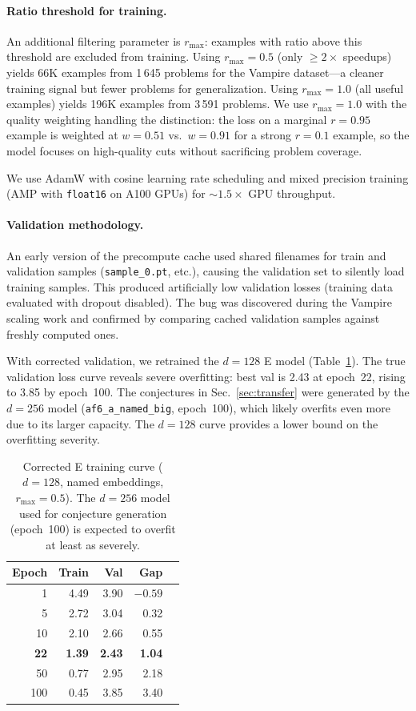 \documentclass{easychair}
\newcommand{\Eprover}{E\xspace}
\newcommand{\Vampire}{Vampire\xspace}
\begin{document}
\paragraph{Ratio threshold for training.}
An additional filtering parameter is $r_{\max}$: examples with ratio
above this threshold are excluded from training.  Using $r_{\max} =
0.5$ (only $\geq 2\times$ speedups) yields 66K examples from 1\,645
problems for the \Vampire dataset---a cleaner training signal but
fewer problems for generalization.  Using $r_{\max} = 1.0$ (all
useful examples) yields 196K examples from 3\,591 problems.  We use
$r_{\max} = 1.0$ with the quality weighting handling the distinction:
the loss on a marginal $r = 0.95$ example is weighted at $w = 0.51$
vs.\ $w = 0.91$ for a strong $r = 0.1$ example, so the model focuses
on high-quality cuts without sacrificing problem coverage.

We use AdamW with cosine learning rate scheduling and mixed precision
training (AMP with \texttt{float16} on A100 GPUs) for ${\sim}1.5\times$
GPU throughput.

\paragraph{Validation methodology.}
An early version of the precompute cache used shared filenames for
train and validation samples (\texttt{sample\_0.pt}, etc.), causing
the validation set to silently load training samples.  This produced
artificially low validation losses (training data evaluated with
dropout disabled).  The bug was discovered during the Vampire
scaling work and confirmed by comparing cached validation samples
against freshly computed ones.

With corrected validation, we retrained the $d{=}128$ \Eprover model
(Table~\ref{tab:eprover-valloss}).  The true validation loss curve
reveals severe overfitting: best val is 2.43 at epoch~22, rising to
3.85 by epoch~100.  The conjectures in Sec.~\ref{sec:transfer} were
generated by the $d{=}256$ model (\texttt{af6\_a\_named\_big},
epoch~100), which likely overfits even more due to its larger
capacity.  The $d{=}128$ curve provides a lower bound on the
overfitting severity.

\begin{table}[t]
\centering
\caption{Corrected \Eprover training curve ($d{=}128$, named embeddings,
  $r_{\max}{=}0.5$).  The $d{=}256$ model used for conjecture
  generation (epoch~100) is expected to overfit at least as severely.}
\label{tab:eprover-valloss}
\small
\begin{tabular}{rrrrr}
\toprule
Epoch & Train & Val & Gap \\
\midrule
1   & 4.49 & 3.90 & $-0.59$ \\
5   & 2.72 & 3.04 & 0.32 \\
10  & 2.10 & 2.66 & 0.55 \\
\textbf{22} & \textbf{1.39} & \textbf{2.43} & \textbf{1.04} \\
50  & 0.77 & 2.95 & 2.18 \\
100 & 0.45 & 3.85 & 3.40 \\
\bottomrule
\end{tabular}
\end{table}
\end{document}
